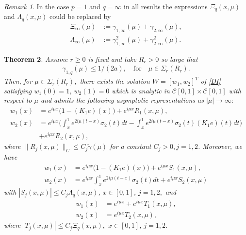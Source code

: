 \documentclass[11pt]{amsart}
\theoremstyle{plain}
\newtheorem{thm}{Theorem}[section]
\theoremstyle{definition}
\theoremstyle{remark}
\newtheorem{rem}[thm]{Remark}
\numberwithin{equation}{section}
\begin{document}
\begin{rem}
In the case $p=1$ and $q=\infty$  in all results  the expressions $\Xi_q(x,\mu)$ and $\Lambda_q(x,\mu)$ could be replaced
by
\begin{align}\label{inf}
\Xi_\infty(\mu)&:= \gamma_{1,\infty}(\mu)+\gamma_{2,\infty}(\mu),
\\
\Lambda_\infty(\mu)&:=\gamma^2_{1,\infty}(\mu)+\gamma^2_{2,\infty}(\mu).
\end{align}
\end{rem}

\begin{thm}\label{thmw}
Assume $r\ge 0$ is fixed and  take $R_r>0$  so large that
\begin{align*}
\gamma_{1,q}(\mu)\le 1/(2a), \quad \mbox{for}\quad \mu\in \Sigma_r(R_r).
\end{align*}
Then, for  $\mu\in \Sigma_r(R_r),$ there exists
the solution $W=[w_1, w_2]^T$ of \eqref{DI} satisfying $w_1(0)=1$, $w_2(1)=0$
which is analytic in $\mathcal{C}[0,1]\times \mathcal{C}[0,1]$ with respect to $\mu$ and
 admits the following
asymptotic representations as $|\mu|\to \infty:$
\begin{align}
w_1(x)&=e^{i \mu x}\Big(1-(K_1e)(x)\Big)+ e^{i \mu x}R_1(x,\mu), \label{A1}\\
w_2(x)&=e^{i \mu x}\Big(\int_x^1 e^{2i \mu (t-x)}\sigma_2(t)dt-\int_x^1e^{2i \mu (t-x)}\sigma_2(t)(K_1e)(t)dt \Big)\nonumber\\
&+ e^{i \mu x}R_2(x,\mu),\nonumber
\end{align}
where
$\|R_j(x,\mu)\|_C \leq C_j \widetilde{\gamma}(\mu)$ for a constant $C_j>0, j=1,2$.
Moreover, we have
\begin{align}
w_1(x)&=e^{i \mu x}\Big(1-(K_1e)(x)\Big)+ e^{i \mu x}S_1(x,\mu),\label{A2}\\
w_2(x)&=e^{i \mu x}\int_x^1 e^{2i \mu (t-x)}\sigma_2(t)dt
+ e^{i \mu x}S_2(x,\mu)\nonumber
\end{align}
with
$|S_j(x,\mu)| \leq C_j \Lambda_q(x,\mu)$,  $x\in [0,1]$, $j=1,2,$
and
\begin{align}
w_1(x)&=e^{i \mu x}+ e^{i \mu x}T_1(x,\mu),\label{A3}\\
w_2(x)&=e^{i \mu x}T_2(x,\mu),\nonumber
\end{align}
where
$|T_j(x,\mu)| \leq C_j \Xi_q(x,\mu),$  $x\in [0,1]$, $j=1,2$.
\end{thm}
\end{document}
